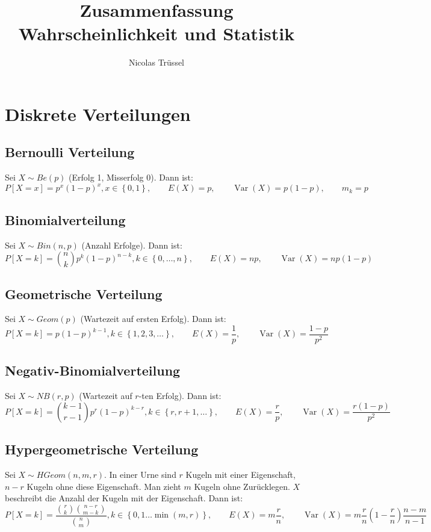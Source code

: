 \documentclass[a4paper,titlepage]{article}
\title{Zusammenfassung Wahrscheinlichkeit und Statistik}
\author{Nicolas Trüssel}
\DeclareMathOperator{\Var}{Var}
\newcommand{\set}[1]{\left\lbrace #1 \right\rbrace}
\begin{document}
\maketitle

\section{Diskrete Verteilungen}
\subsection{Bernoulli Verteilung}
Sei $X \sim Be(p)$ (Erfolg 1, Misserfolg 0). Dann ist:
\begin{equation*}
P[X=x] = p^x(1-p)^x, x \in \set{0,1}, \qquad E(X) = p, \qquad \Var(X) = p(1-p), \qquad m_k = p
\end{equation*}

\subsection{Binomialverteilung}
Sei $X \sim Bin(n,p)$ (Anzahl Erfolge). Dann ist:
\begin{equation*}
P[X=k] = \binom{n}{k}p^k(1-p)^{n-k}, k \in \set{0,\dots,n}, \qquad E(X) = np, \qquad \Var(X) = np(1-p)
\end{equation*}

\subsection{Geometrische Verteilung}
Sei $X \sim Geom(p)$ (Wartezeit auf ersten Erfolg). Dann ist:
\begin{equation*}
P[X = k] = p(1-p)^{k-1}, k \in \set{1,2,3,\dots}, \qquad E(X) = \frac{1}{p}, \qquad \Var(X) = \frac{1-p}{p^2}
\end{equation*}

\subsection{Negativ-Binomialverteilung}
Sei $X \sim NB(r,p)$ (Wartezeit auf $r$-ten Erfolg). Dann ist:
\begin{equation*}
P[X = k] = \binom{k-1}{r-1}p^r(1-p)^{k-r}, k \in \set{r,r+1, \dots}, \qquad E(X) = \frac{r}{p}, \qquad \Var(X) = \frac{r(1-p)}{p^2}
\end{equation*}

\subsection{Hypergeometrische Verteilung}
Sei $X \sim HGeom(n,m,r)$. In einer Urne sind $r$ Kugeln mit einer Eigenschaft, $n-r$ Kugeln ohne diese Eigenschaft. Man zieht $m$ Kugeln ohne Zurücklegen. $X$ beschreibt die Anzahl der Kugeln mit der Eigenschaft. Dann ist:
\begin{equation*}
P[X = k] = \frac{\binom{r}{k} \binom{n-r}{m-k}}{\binom{n}{m}}, k \in \set{0,1 \dots \min(m,r)}, \qquad E(X) = m \frac{r}{n}, \qquad \Var(X) = m \frac{r}{n} \left( 1- \frac{r}{n}\right) \frac{n-m}{n-1}
\end{equation*}
\end{document}
